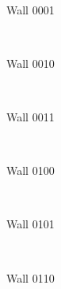 \documentclass[11pt,a4paper]{report}
\newenvironment{img}{
	\begin{center}
		\begin{figure}[H]
			\begin{center}
			
}{
	\end{center}
		\end{figure}
			\end{center}
}
\begin{document}
				\begin{img}
					\\
					\caption{Wall 0001}
				\end{img}
				\begin{img}
					\\
					\caption{Wall 0010}
				\end{img}
				\begin{img}
					\\
					\caption{Wall 0011}
				\end{img}
				\begin{img}
					\\
					\caption{Wall 0100}
				\end{img}
				\begin{img}
					\\
					\caption{Wall 0101}
				\end{img}
				\begin{img}
					\\
					\caption{Wall 0110}
				\end{img}
\end{document}
